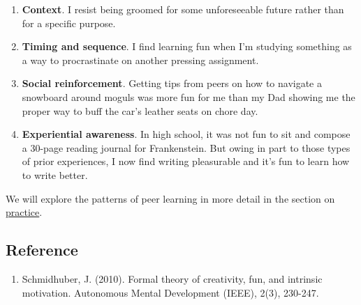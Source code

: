 \begin{enumerate}
\itemsep1pt\parskip0pt
\item
  \textbf{Context}. I resist being groomed for some unforeseeable future
  rather than for a specific purpose.
\item
  \textbf{Timing and sequence}. I find learning fun when I'm studying
  something as a way to procrastinate on another pressing assignment.
\item
  \textbf{Social reinforcement}. Getting tips from peers on how to
  navigate a snowboard around moguls was more fun for me than my Dad
  showing me the proper way to buff the car's leather seats on chore
  day.
\item
  \textbf{Experiential awareness}. In high school, it was not fun to sit
  and compose a 30-page reading journal for Frankenstein. But owing in
  part to those types of prior experiences, I now find writing
  pleasurable and it's fun to learn how to write better.
\end{enumerate}

We will explore the patterns of peer learning in more detail in the
section on \href{http://peeragogy.org/practice/}{practice}.

\subsection{Reference}

\begin{enumerate}
\itemsep1pt\parskip0pt
\item
  Schmidhuber, J. (2010). Formal theory of creativity, fun, and
  intrinsic motivation. Autonomous Mental Development (IEEE), 2(3),
  230-247.
\end{enumerate}
